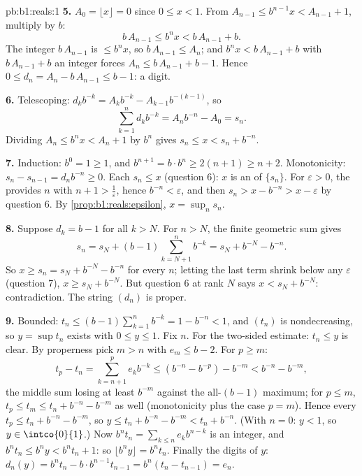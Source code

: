 \begin{solution}{pb:b1:reals:1}
\textbf{5.} $A_0 = \lfloor x \rfloor = 0$ since $0 \leq x < 1$.
From $A_{n-1} \leq b^{n-1} x < A_{n-1} + 1$, multiply by $b$:
\[
b\,A_{n-1} \leq b^n x < b\,A_{n-1} + b .
\]
The integer $b\,A_{n-1}$ is $\leq b^n x$, so $b\,A_{n-1} \leq
A_n$; and $b^n x < b\,A_{n-1} + b$ with $b\,A_{n-1} + b$ an
integer forces $A_n \leq b\,A_{n-1} + b - 1$. Hence $0 \leq d_n =
A_n - b\,A_{n-1} \leq b - 1$: a digit.

\textbf{6.} Telescoping: $d_k b^{-k} = A_k b^{-k} - A_{k-1}
b^{-(k-1)}$, so
\[
\sum_{k=1}^n d_k b^{-k} = A_n b^{-n} - A_0 = s_n .
\]
Dividing $A_n \leq b^n x < A_n + 1$ by $b^n$ gives $s_n \leq x <
s_n + b^{-n}$.

\textbf{7.} Induction: $b^0 = 1 \geq 1$, and $b^{n+1} = b \cdot
b^n \geq 2(n + 1) \geq n + 2$. Monotonicity: $s_n - s_{n-1} = d_n
b^{-n} \geq 0$. Each $s_n \leq x$ (question 6): $x$ is an  of $\{s_n\}$. For $\varepsilon > 0$, the  provides $n$ with $n + 1 > \frac1\varepsilon$, hence
$b^{-n} < \varepsilon$, and then $s_n > x - b^{-n} > x -
\varepsilon$ by question 6. By \cref{prop:b1:reals:epsilon}, $x =
\sup_n s_n$.

\textbf{8.} Suppose $d_k = b - 1$ for all $k > N$. For $n > N$,
the finite geometric sum gives
\[
s_n = s_N + (b - 1)\sum_{k=N+1}^{n} b^{-k}
= s_N + b^{-N} - b^{-n} .
\]
So $x \geq s_n = s_N + b^{-N} - b^{-n}$ for every $n$; letting
the last term shrink below any $\varepsilon$ (question 7), $x
\geq s_N + b^{-N}$. But question 6 at rank $N$ says $x < s_N +
b^{-N}$: contradiction. The string $(d_n)$ is proper.

\textbf{9.} Bounded: $t_n \leq (b-1)\sum_{k=1}^n b^{-k} = 1 -
b^{-n} < 1$, and $(t_n)$ is nondecreasing, so $y = \sup t_n$
exists with $0 \leq y \leq 1$. Fix $n$. For the two-sided
estimate: $t_n \leq y$ is clear. By properness pick $m > n$ with
$e_m \leq b - 2$. For $p \geq m$:
\[
t_p - t_n = \sum_{k=n+1}^{p} e_k b^{-k}
\leq (b^{-n} - b^{-p}) - b^{-m} < b^{-n} - b^{-m},
\]
the middle sum losing at least $b^{-m}$ against the all-$(b-1)$
maximum; for $p \leq m$, $t_p \leq t_m \leq t_n + b^{-n} -
b^{-m}$ as well (monotonicity plus the case $p = m$). Hence every
$t_p \leq t_n + b^{-n} - b^{-m}$, so $y \leq t_n + b^{-n} -
b^{-m} < t_n + b^{-n}$. (With $n = 0$: $y < 1$, so $y \in
\intco{0}{1}$.) Now $b^n t_n = \sum_{k \leq n} e_k b^{n-k}$ is an
integer, and $b^n t_n \leq b^n y < b^n t_n + 1$: so $\lfloor b^n
y \rfloor = b^n t_n$. Finally the digits of $y$: $d_n(y) = b^n
t_n - b \cdot b^{n-1} t_{n-1} = b^n(t_n - t_{n-1}) = e_n$.


\end{solution}
